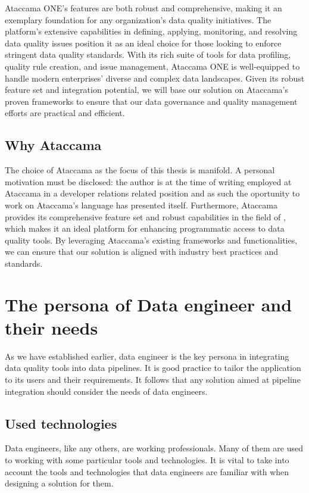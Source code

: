 Ataccama ONE's  features are both robust and comprehensive, making it an exemplary foundation for any organization's data quality initiatives. The platform's extensive capabilities in defining, applying, monitoring, and resolving data quality issues position it as an ideal choice for those looking to enforce stringent data quality standards. With its rich suite of tools for data profiling, quality rule creation, and issue management, Ataccama ONE is well-equipped to handle modern enterprises' diverse and complex data landscapes. Given its robust feature set and integration potential, we will base our solution on Ataccama's proven frameworks to ensure that our data governance and quality management efforts are practical and efficient.

\subsection{Why Ataccama}

The choice of Ataccama as the focus of this thesis is manifold. A personal motivation must be disclosed: the author is at the time of writing employed at Ataccama in a developer relations related position and as such the oportunity to work on Ataccama's language has presented itself. Furthermore, Ataccama provides its comprehensive feature set and robust capabilities in the field of , which makes it an ideal platform for enhancing programmatic access to data quality tools. By leveraging Ataccama's existing frameworks and functionalities, we can ensure that our solution is aligned with industry best practices and standards.

\section{The persona of Data engineer and their needs}

As we have established earlier, data engineer is the key persona in integrating data quality tools into data pipelines. It is good practice to tailor the application to its users and their requirements. It follows that any solution aimed at pipeline integration should consider the needs of data engineers.

\subsection{Used technologies}

Data engineers, like any others, are working professionals. Many of them are used to working with some particular tools and technologies. It is vital to take into account the tools and technologies that data engineers are familiar with when designing a solution for them.

